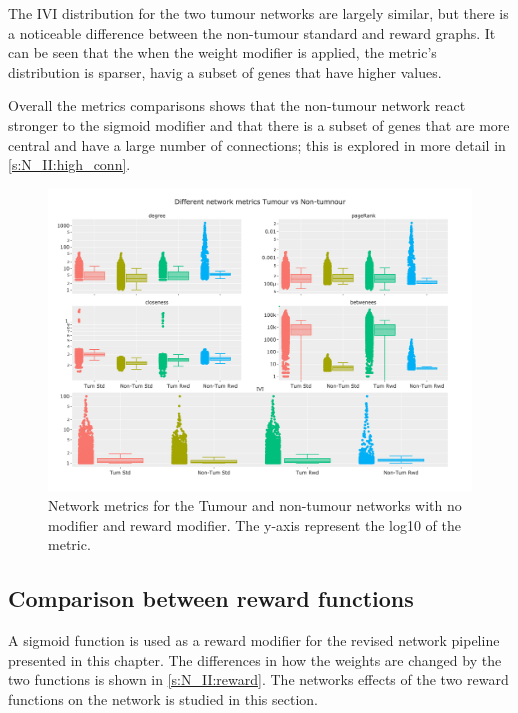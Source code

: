 The IVI distribution for the two tumour networks are largely similar, but there is a noticeable difference between the non-tumour standard and reward graphs. It can be seen that the when the weight modifier is applied, the metric's distribution is sparser, havig a subset of genes that have higher values.

Overall the metrics comparisons shows that the non-tumour network react stronger to the sigmoid modifier and that there is a subset of genes that are more central and have a large number of connections; this is explored in more detail in \cref{s:N_II:high_conn}.

\begin{figure}[!htb]    
    \centering
    \includegraphics[width=1.0\textwidth,height=0.7\textheight,keepaspectratio]{Sections/Network_II/validation/network_comparison.png}
    \caption{Network metrics for the Tumour and non-tumour networks with no modifier and reward modifier. The y-axis represent the log10 of the metric. }
    \label{fig:N_II:net_metrics_comp}
\end{figure}


\subsection{Comparison between reward functions} \label{s:N_II:reward_comp}



A sigmoid function is used as a reward modifier for the revised network pipeline presented in this chapter. The differences in how the weights are changed by the two functions is shown in \cref{s:N_II:reward}. The networks effects of the two reward functions on the network is studied in this section.

